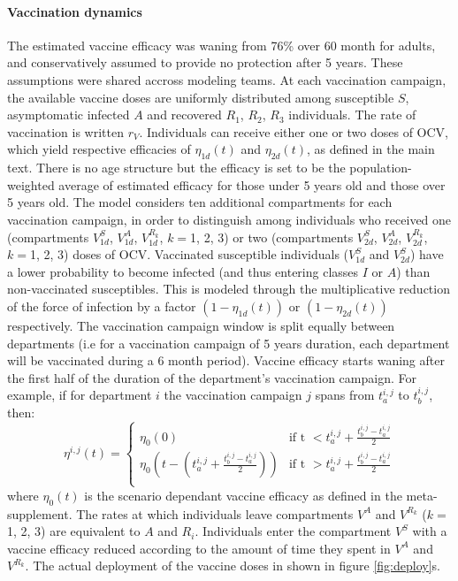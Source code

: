 \paragraph{Vaccination dynamics} The estimated vaccine efficacy was waning from 76\% over 60 month for adults, and conservatively assumed to provide no protection after 5 years. These assumptions were shared accross modeling teams. 
At each vaccination campaign, the available vaccine doses are uniformly distributed among susceptible $S$, asymptomatic infected $A$ and recovered $R_{1}$, $R_2$, $R_3$ individuals. The rate of vaccination is written $r_V$. Individuals can receive either one or two doses of OCV, which yield respective efficacies of $\eta_{1d}(t)$ and $\eta_{2d}(t)$, as defined in the main text. There is no age structure but the efficacy is set to be the population-weighted average of estimated efficacy for those under 5 years old and those over 5 years old.
 The model considers ten additional compartments for each vaccination campaign, in order to distinguish among individuals who received one (compartments $V^S_{1d}$, $V^A_{1d}$, $V^{R_k}_{1d}$, $k=$1, 2, 3) or two (compartments $V^S_{2d}$, $V^A_{2d}$, $V^{R_k}_{2d}$, $k=$1, 2, 3) doses of OCV. Vaccinated susceptible individuals ($V^S_{1d}$ and $V^S_{2d}$) have a lower probability to become infected (and thus entering classes $I$ or $A$) than non-vaccinated susceptibles. This is modeled through the multiplicative reduction of the force of infection by a  factor $(1-\eta_{1d}(t))$ or $(1-\eta_{2d}(t))$ respectively.
The vaccination campaign window is split equally between departments (i.e for a vaccination campaign of 5 years duration, each department will be vaccinated during a 6 month period). Vaccine efficacy starts waning after the first half of the duration of the department's vaccination campaign. For example, if for department $i$ the vaccination campaign $j$ spans from $t^{i,j}_a$ to $t^{i,j}_b$, then:
    \begin{equation}
\eta^{i,j}(t) = \left\{
    \begin{array}{ll}
        \eta_0(0) & \mbox{if t $<  t^{i,j}_a + \frac{t^{i,j}_b - t^{i,j}_a}{2}$} \\
        \eta_0(t -  (t^{i,j}_a +  \frac{t^{i,j}_b - t^{i,j}_a}{2}) ) & \mbox{if t $>  t^{i,j}_a + \frac{t^{i,j}_b - t^{i,j}_a}{2}$} \\
    \end{array}
\right.
\end{equation}
where $\eta_0(t)$ is the scenario dependant vaccine efficacy as defined in the meta-supplement.
The rates at which individuals leave compartments $V^A$ and $V^{R_k}$ ($k=$1, 2, 3) are equivalent to $A$ and $R_i$. Individuals enter the compartment $V^S$ with a vaccine efficacy reduced according to the amount of time they spent in $V^A$ and $V^{R_k}$. The actual deployment of the vaccine doses in shown in figure \ref{fig:deploy}s.

